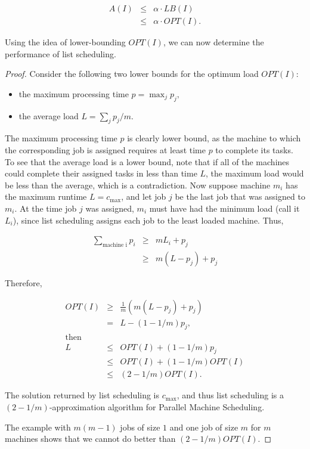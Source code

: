 \documentclass{article}
\begin{document}
$$
\begin{array}{lcl}
A(I)    & \le & \alpha \cdot LB(I) \\
        & \le & \alpha \cdot OPT(I).
\end{array}
$$

Using the idea of lower-bounding $OPT(I)$, we can now determine the performance of list
scheduling.

{}

\begin{proof}

Consider the following two lower bounds for the optimum load $OPT(I)$:

\begin{itemize}

\item the maximum processing time $p = \max_j p_j,$
\item the average load $L = \sum_j p_j/m.$

\end{itemize}

The maximum processing time $p$ is clearly lower bound, as the machine to which the corresponding
job is assigned requires at least time $p$ to complete its tasks. To see that the average load is
a lower bound, note that if all of the machines could complete their assigned tasks in less than
time $L$, the maximum load would be less than the average, which is a contradiction. Now suppose
machine $m_i$ has the maximum runtime $L = c_{\max}$, and let job $j$ be the last job that was
assigned to $m_i$. At the time job $j$ was assigned, $m_i$ must have had the minimum load (call it
$L_i$), since list scheduling assigns each job to the least loaded machine. Thus,

$$
\begin{array}{lcl}
\sum\limits_{\mbox{machine i}} p_i  & \ge & m L_i + p_j \\
                                    & \ge & m (L - p_j) + p_j
\end{array}
$$

Therefore,

$$
\begin{array} {lcl}
OPT(I)  & \ge & \frac{1}{m} \left( m (L - p_j) + p_j \right) \\
        & = & L - (1-1/m) p_j, \\
\mbox{then}        \\
L       & \le & OPT(I) + (1 - 1/m) p_j \\
        & \le & OPT(I) + (1 - 1/m) OPT(I) \\
        & \le & (2 - 1/m) OPT(I).
\end{array}
$$

The solution returned by list scheduling is $c_{\max}$, and thus list scheduling is a
$(2-1/m)$-approximation algorithm for Parallel Machine Scheduling.

The example with $m(m-1)$ jobs of size $1$ and one job of size $m$ for $m$ machines shows that we
cannot do better than $(2-1/m)OPT(I)$.

\end{proof}
\end{document}

